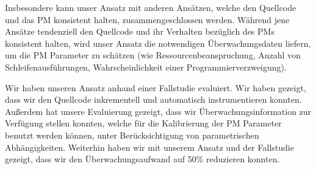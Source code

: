 Insbesondere	kann	unser	Ansatz	mit	anderen	Ansätzen,	welche	den	Quellcode	und	das	PM	
konsistent	halten,	zusammengeschlossen	werden.	Während	jene	Ansätze	tendenziell	den	
Quellcode	und	ihr	Verhalten	bezüglich	des	PMs	konsistent	halten,	wird	unser	Ansatz	die	
notwendigen	Überwachungsdaten	liefern,	um	die	PM	Parameter	zu	schätzen	(wie	
Ressourcenbeanspruchung,	Anzahl	von	Schleifenausführungen,	Wahrscheinlichkeit	einer	
Programmierverzweigung).

Wir	haben	unseren	Ansatz	anhand	einer	Fallstudie	evaluiert.	Wir	haben	gezeigt,	dass	wir	den	
Quellcode	inkrementell	und	automatisch	instrumentieren	konnten.	Außerdem	hat	unsere	
Evaluierung	gezeigt,	dass	wir	Überwachungsinformation	zur	Verfügung	stellen	konnten,	
welche	für	die	Kalibrierung	der	PM	Parameter	benutzt	werden	können,	unter	
Berücksichtigung	von	parametrischen	Abhängigkeiten.	Weiterhin	haben	wir	mit	unserem	
Ansatz	und	der	Fallstudie	gezeigt,	dass	wir	den	Überwachungsaufwand	auf	50\%	reduzieren	
konnten.